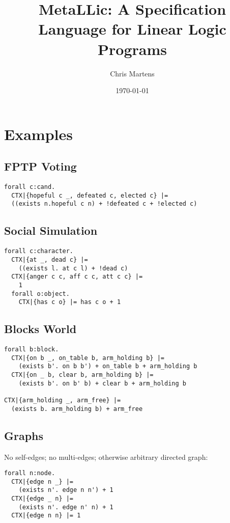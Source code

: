 \documentclass[fullpage, 11pt]{article}
\title{MetaLLic: A Specification Language for Linear Logic Programs}
\author{Chris Martens}
\date{\today}
\begin{document}
\maketitle

\abstract


\section{Examples}

\subsection*{FPTP Voting}

\begin{verbatim}
forall c:cand.
  CTX|{hopeful c _, defeated c, elected c} |=
  ((exists n.hopeful c n) + !defeated c + !elected c) 
\end{verbatim}

\subsection*{Social Simulation}

\begin{verbatim}
forall c:character.
  CTX|{at _, dead c} |=
    ((exists l. at c l) + !dead c)
  CTX|{anger c c, aff c c, att c c} |=
    1
  forall o:object.
    CTX|{has c o} |= has c o + 1
\end{verbatim}


\subsection*{Blocks World}

\begin{verbatim}
forall b:block.
  CTX|{on b _, on_table b, arm_holding b} |=
    (exists b'. on b b') + on_table b + arm_holding b
  CTX|{on _ b, clear b, arm_holding b} |=
    (exists b'. on b' b) + clear b + arm_holding b

CTX|{arm_holding _, arm_free} |=
  (exists b. arm_holding b) + arm_free
\end{verbatim}

\subsection*{Graphs}
No self-edges; no multi-edges; otherwise arbitrary directed graph:

\begin{verbatim}
forall n:node.
  CTX|{edge n _} |=
    (exists n'. edge n n') + 1
  CTX|{edge _ n} |=
    (exists n'. edge n' n) + 1
  CTX|{edge n n} |= 1
\end{verbatim}
\end{document}

